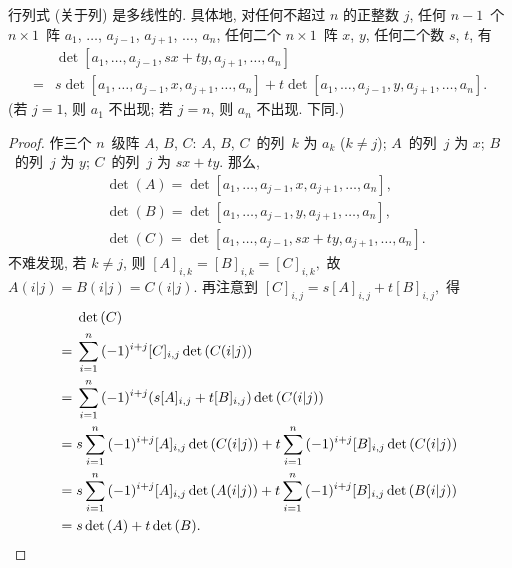 \TheoremExpansionAboutAnyColumn*

\begin{theorem}[多线性]
    行列式 (关于列) 是多线性的.
    具体地, 对任何不超过 \(n\) 的正整数 \(j\),
    任何 \(n-1\)~个 \(n \times 1\)~阵
    \(a_1\), \(\dots\), \(a_{j-1}\),
    \(a_{j+1}\), \(\dots\), \(a_n\),
    任何二个 \(n \times 1\)~阵 \(x\), \(y\),
    任何二个数 \(s\), \(t\),
    有
    \begin{align*}
             & \det
        {[a_1, \dots, a_{j-1}, sx + ty, a_{j+1}, \dots, a_n]}
        \\
        = {} &
        s
        \det {[a_1, \dots, a_{j-1}, x, a_{j+1}, \dots, a_n]}
        +
        t
        \det {[a_1, \dots, a_{j-1}, y, a_{j+1}, \dots, a_n]}.
    \end{align*}
    (若 \(j = 1\), 则 \(a_1\) 不出现;
    若 \(j = n\), 则 \(a_n\) 不出现.
    下同.)
\end{theorem}

\begin{proof}
    作三个 \(n\)~级阵 \(A\), \(B\), \(C\):
    \(A\), \(B\), \(C\)~的列~\(k\) 为 \(a_k\) (\(k \neq j\));
    \(A\)~的列~\(j\) 为 \(x\);
    \(B\)~的列~\(j\) 为 \(y\);
    \(C\)~的列~\(j\) 为 \(sx + ty\).
    那么,
    \begin{align*}
         & \det {(A)}
        = \det
        {[a_1, \dots, a_{j-1}, x, a_{j+1}, \dots, a_n]},
        \\
         & \det {(B)}
        = \det
        {[a_1, \dots, a_{j-1}, y, a_{j+1}, \dots, a_n]},
        \\
         & \det {(C)}
        = \det
        {[a_1, \dots, a_{j-1}, sx + ty, a_{j+1}, \dots, a_n]}.
    \end{align*}
    不难发现, 若 \(k \neq j\), 则
    \(
    [A]_{i,k} = [B]_{i,k} = [C]_{i,k},
    \)
    故
    \(
    A(i|j) = B(i|j) = C(i|j).
    \)
    再注意到
    \(
    [C]_{i,j} = s[A]_{i,j} + t[B]_{i,j},
    \)
    得
    \begin{align*}
             & \det {(C)}
        \\
        = {} &
        \sum_{i = 1}^{n} {
        (-1)^{i+j} [C]_{i,j} \det {(C(i|j))}
        }
        \\
        = {} &
        \sum_{i = 1}^{n} {
        (-1)^{i+j} (s[A]_{i,j} + t[B]_{i,j}) \det {(C(i|j))}
        }
        \\
        = {} &
        s\sum_{i = 1}^{n} {
        (-1)^{i+j} [A]_{i,j} \det {(C(i|j))}
        }
        +
        t\sum_{i = 1}^{n} {
        (-1)^{i+j} [B]_{i,j} \det {(C(i|j))}
        }
        \\
        = {} &
        s\sum_{i = 1}^{n} {
        (-1)^{i+j} [A]_{i,j} \det {(A(i|j))}
        }
        +
        t\sum_{i = 1}^{n} {
        (-1)^{i+j} [B]_{i,j} \det {(B(i|j))}
        }
        \\
        = {} &
        s \det{(A)} + t \det{(B)}.
        \qedhere
    \end{align*}
\end{proof}

